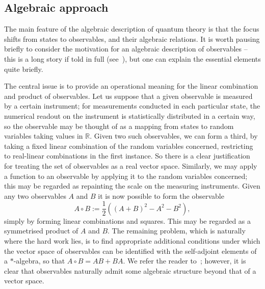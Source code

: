 \documentclass[12pt]{article}
\newcommand{\1}{\mathds{1}}                         %
\newcommand{\RR}{\mathbb{R}}           %
\begin{document}
\subsection{Algebraic approach}\label{sec:AQM}
The main feature of the algebraic description of quantum theory is that the focus shifts from states to observables, and their algebraic relations. It is worth pausing briefly to consider the motivation for an algebraic description of observables -- this is a long story if told in full (see~\cite{Emch}), but one can explain the essential elements quite briefly. 

The central issue is to provide an operational meaning for the linear combination and product of observables. Let us suppose that a given observable is measured by a certain instrument; for measurements conducted in each particular state, the numerical readout on the instrument is statistically distributed in a certain way, so the observable may be thought of as a mapping from states to random variables taking values in $\RR$. Given two such observables, we can form a third, by taking a fixed linear combination of the random variables concerned, restricting to real-linear combinations in the first instance. So there is a clear justification for treating the set of observables as a real vector space. Similarly, we may apply a function to an observable by applying it to the random variables concerned; this may be regarded as repainting the scale on the measuring instruments. Given any
two observables $A$ and $B$ it is now possible to form the observable
\begin{equation}
A\circ B:= \frac{1}{2}\left((A+B)^2 - A^2 - B^2\right),
\end{equation} 
simply by forming linear combinations and squares. This may be regarded as a symmetrised product of $A$ and $B$. The remaining problem, which is naturally where the hard work lies, is to find appropriate additional conditions under which the vector space of observables can be identified with the self-adjoint elements of a $*$-algebra, so that $A\circ B = AB + BA$. We refer the reader to~\cite{Emch}; however, it is clear that observables naturally admit some algebraic structure beyond that of a vector space. 
\end{document}
